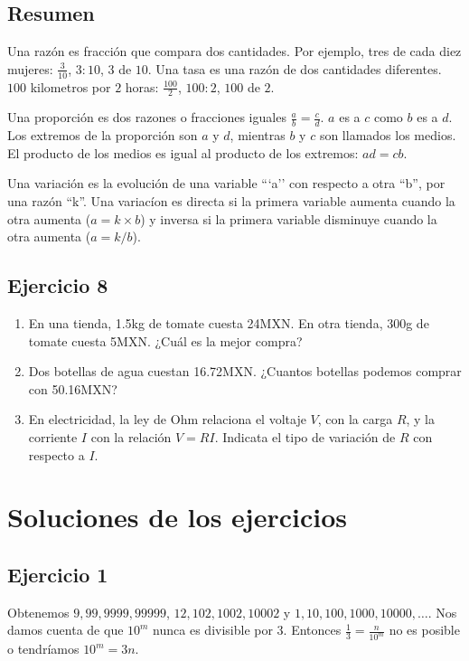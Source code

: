 \subsection*{Resumen}

Una razón es fracción que compara dos cantidades. Por ejemplo,
tres de cada diez mujeres:
$\frac{3}{10}$, $3:10$, $3$ de $10$. Una tasa es una razón de dos cantidades
diferentes. $100$ kilometros por $2$ horas: $\frac{100}{2}$, $100 : 2$,
$100$ de $2$.

Una proporción es dos razones o fracciones iguales $\frac{a}{b} = \frac{c}{d}$.
$a$ es a $c$ como $b$ es a $d$. Los extremos de la proporción son $a$ y $d$,
mientras $b$ y $c$ son llamados los medios. El producto de los medios es igual
al producto de los extremos: $a d = c b$.

Una variación es la evolución de una variable ```a'' con respecto a otra
``b'', por una razón ``k''. Una variacíon es directa si la primera variable
aumenta cuando la otra aumenta ($a = k \times b$) y inversa si la
primera variable disminuye cuando la otra aumenta ($a = k / b$).

\subsection*{Ejercicio 8}

\begin{enumerate}
\item En una tienda, 1.5kg de tomate cuesta 24MXN. En otra tienda, 300g de
  tomate cuesta 5MXN. ¿Cuál es la mejor compra?
\item Dos botellas de agua cuestan 16.72MXN. ¿Cuantos botellas podemos comprar
  con 50.16MXN?
\item En electricidad, la ley de Ohm relaciona el voltaje $V$, con la carga
  $R$, y la corriente $I$ con la relación $V=RI$. Indicata el tipo de
  variación de $R$ con respecto a $I$.
\end{enumerate}

\section{Soluciones de los ejercicios}

\subsection*{Ejercicio 1}

Obtenemos $9, 99, 9999, 99999$, $12, 102, 1002, 10002$ y
$1, 10, 100, 1000, 10000, \ldots$. Nos damos cuenta de que $10^m$ nunca es divisible
por $3$. Entonces $\frac{1}{3} = \frac{n}{10^m}$ no es posible o tendríamos
$10^m = 3n$.

